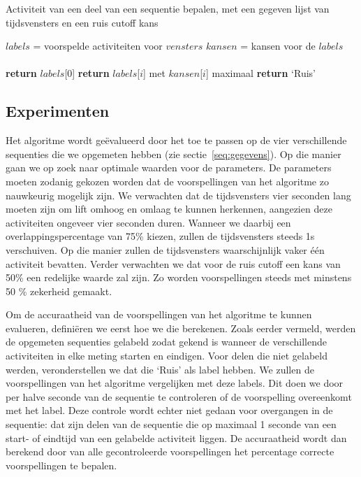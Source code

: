 \documentclass{article}
\begin{document}
\begin{algorithm}
  \caption{Activiteit van een deel van een sequentie bepalen, met een gegeven lijst van tijdsvensters en een ruis cutoff kans}
  \label{alg:deel}
  \begin{algorithmic}[0]
      \State $labels$ = voorspelde activiteiten voor $vensters$ 
      \State $kansen$ = kansen voor de $labels$ \\
       \\
        \State \textbf{return} $labels$[$0$]
      \Else
          \State \textbf{return} $labels$[$i$] met $kansen$[$i$] maximaal
        \Else
          \State \textbf{return} `Ruis'
        \EndIf
      \EndIf
    \EndProcedure
  \end{algorithmic}
\end{algorithm}

\subsection{Experimenten}
\label{experimenten}

Het algoritme wordt ge\"evalueerd door het toe te passen op de vier verschillende sequenties die we opgemeten hebben (zie sectie~\ref{seq:gegevens}). Op die manier gaan we op zoek naar optimale waarden voor de parameters. De parameters moeten zodanig gekozen worden dat de voorspellingen van het algoritme zo nauwkeurig mogelijk zijn. We verwachten dat de tijdsvensters vier seconden lang moeten zijn om lift omhoog en omlaag te kunnen herkennen, aangezien deze activiteiten ongeveer vier seconden duren. Wanneer we daarbij een overlappingspercentage van 75\% kiezen, zullen de tijdsvensters steeds 1s verschuiven. Op die manier zullen de tijdsvensters waarschijnlijk vaker \'e\'en activiteit bevatten. Verder verwachten we dat voor de ruis cutoff een kans van 50\% een redelijke waarde zal zijn. Zo worden voorspellingen steeds met minstens 50 \% zekerheid gemaakt. 

Om de accuraatheid van de voorspellingen van het algoritme te kunnen evalueren, defini\"eren we eerst hoe we die berekenen. Zoals eerder vermeld, werden de opgemeten sequenties gelabeld zodat gekend is wanneer de verschillende activiteiten in elke meting starten en eindigen. Voor delen die niet gelabeld werden, veronderstellen we dat die `Ruis' als label hebben. We zullen de voorspellingen van het algoritme vergelijken met deze labels. Dit doen we door per halve seconde van de sequentie te controleren of de voorspelling overeenkomt met het label. Deze controle wordt echter niet gedaan voor overgangen in de sequentie: dat zijn delen van de sequentie die op maximaal 1 seconde van een start- of eindtijd van een gelabelde activiteit liggen. De accuraatheid wordt dan berekend door van alle gecontroleerde voorspellingen het percentage correcte voorspellingen te bepalen.
\end{document}
